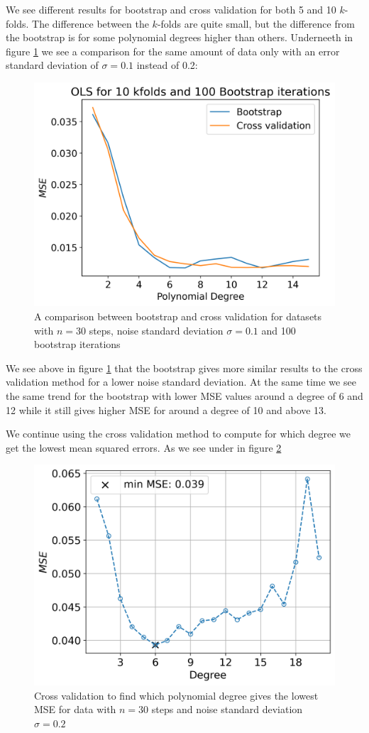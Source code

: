 \documentclass[12pt]{article}
\begin{document}
We see different results for bootstrap and cross validation for both 5 and 10 $k$-folds. The difference between the $k$-folds are quite small, but the difference from the bootstrap is for some polynomial degrees higher than others. Underneeth in figure \ref{fig:cv_comp_01} we see a comparison for the same amount of data only with an error standard deviation of $\sigma=0.1$ instead of 0.2:
\begin{figure}[H]
  \centering
  \includegraphics[width=.7\textwidth]{../figures/boot_cv_comp_01.png}
  \caption{A comparison between bootstrap and cross validation for datasets with $n=30$ steps, noise standard deviation $\sigma=0.1$ and 100 bootstrap iterations}
  \label{fig:cv_comp_01}
\end{figure}
We see above in figure \ref{fig:cv_comp_01} that the bootstrap gives more similar results to the cross validation method for a lower noise standard deviation. At the same time we see the same trend for the bootstrap with lower MSE values around a degree of 6 and 12 while it still gives higher MSE for around a degree of 10 and above 13.

We continue using the cross validation method to compute for which degree we get the lowest mean squared errors. As we see under in figure \ref{fig:best_OLS}
\begin{figure}[H]
  \centering
  \includegraphics[width=.7\textwidth]{../figures/best_lambda_OLS_02_franke.png}
  \caption{Cross validation to find which polynomial degree gives the lowest MSE for data with $n=30$ steps and noise standard deviation $\sigma=0.2$}
  \label{fig:best_OLS}
\end{figure}
\end{document}
